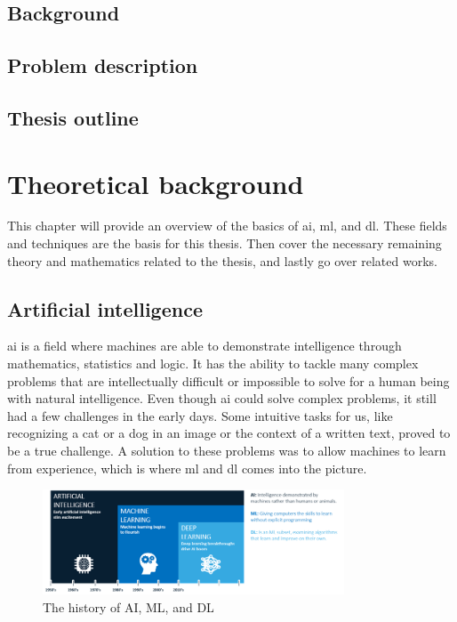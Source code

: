 \documentclass[USenglish]{ifimaster}  %
\begin{document}
\section{Background}
\section{Problem description}
\section{Thesis outline}

\chapter{Theoretical background}
This chapter will provide an overview of the basics of \ac{ai}, \ac{ml}, and \ac{dl}. These fields and techniques are the basis for this thesis. Then cover the necessary remaining theory and mathematics related to the thesis, and lastly go over related works. 
\section{Artificial intelligence}
\ac{ai} is a field where machines are able to demonstrate intelligence through mathematics, statistics and logic. It has the ability to tackle many complex problems that are intellectually difficult or impossible to solve for a human being with natural intelligence. Even though \ac{ai} could solve complex problems, it still had a few challenges in the early days. Some intuitive tasks for us, like recognizing a cat or a dog in an image or the context of a written text, proved to be a true challenge. A solution to these problems was to allow machines to learn from experience, which is where \ac{ml} and \ac{dl} comes into the picture\cite{The_holy_grail_of_DL}.
\begin{figure}[ht]
    \centering
    \includegraphics[width=0.8\textwidth]{bilder/AI_ML_DL.png}
    \caption{The history of AI, ML, and DL
    \protect\cite{website:AI}}
    \label{fig:AI}
\end{figure}
\end{document}
